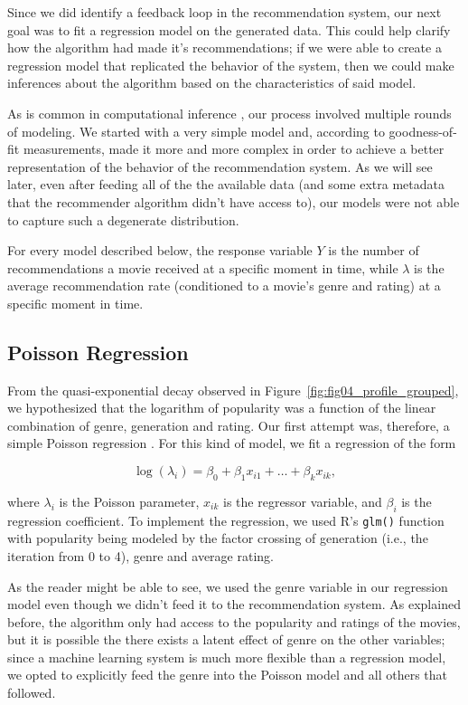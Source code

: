 Since we did identify a feedback loop in the recommendation system, our next
goal was to fit a regression model on the generated data. This could help
clarify how the algorithm had made it's recommendations; if we were able to
create a regression model that replicated the behavior of the system, then we
could make inferences about the algorithm based on the characteristics of said
model.

As is common in computational inference \citep{robert_james_2011}, our process
involved multiple rounds of modeling. We started with a very simple model and,
according to goodness-of-fit measurements, made it more and more complex in
order to achieve a better representation of the behavior of the recommendation
system. As we will see later, even after feeding all of the the available data
(and some extra metadata that the recommender algorithm didn't have access to),
our models were not able to capture such a degenerate distribution.

For every model described below, the response variable $Y$ is the number of
recommendations a movie received at a specific moment in time, while $\lambda$
is the average recommendation rate (conditioned to a movie's genre and rating)
at a specific moment in time.

\subsection{Poisson Regression}
\label{subsec:poisson04}

From the quasi-exponential decay observed in
Figure~\ref{fig:fig04_profile_grouped}, we hypothesized that the logarithm of
popularity was a function of the linear combination of genre, generation and
rating. Our first attempt was, therefore, a simple Poisson regression
\citep{allison_fixed-effects_2002}. For this kind of model, we fit a regression
of the form

$$
\log(\lambda_i) = \beta_0 + \beta_1 x_{i1} + \dots + \beta_k x_{ik},
$$

\noindent where $\lambda_i$ is the Poisson parameter, $x_{ik}$ is the regressor
variable, and $\beta_i$ is the regression coefficient. To implement the
regression, we used R's \verb|glm()| \citep{rcore_stats_2022} function with
popularity being modeled by the factor crossing of generation (i.e., the
iteration from 0 to 4), genre and average rating.

As the reader might be able to see, we used the genre variable in our regression
model even though we didn't feed it to the recommendation system. As explained
before, the algorithm only had access to the popularity and ratings of the
movies, but it is possible the there exists a latent effect of genre on the
other variables; since a machine learning system is much more flexible than a
regression model, we opted to explicitly feed the genre into the Poisson model
and all others that followed.

